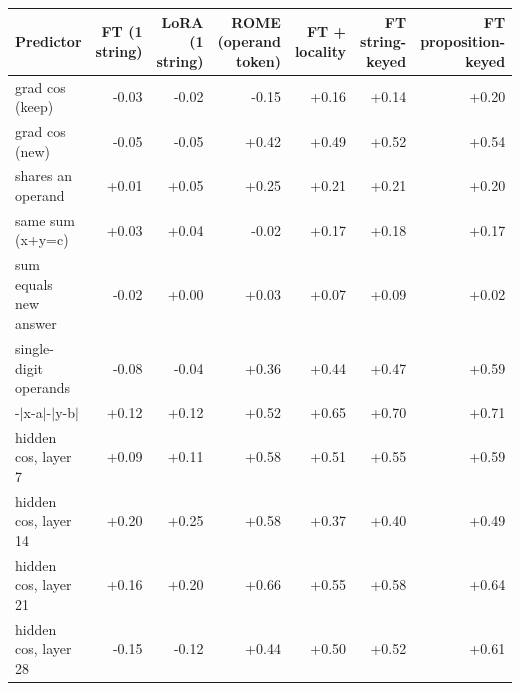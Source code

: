 \begin{tabular}{lrrrrrr}
\toprule
Predictor & FT (1 string) & LoRA (1 string) & ROME (operand token) & FT + locality & FT string-keyed & FT proposition-keyed \\
\midrule
grad cos (keep) & -0.03 & -0.02 & -0.15 & +0.16 & +0.14 & +0.20 \\
grad cos (new) & -0.05 & -0.05 & +0.42 & +0.49 & +0.52 & +0.54 \\
shares an operand & +0.01 & +0.05 & +0.25 & +0.21 & +0.21 & +0.20 \\
same sum (x+y=c) & +0.03 & +0.04 & -0.02 & +0.17 & +0.18 & +0.17 \\
sum equals new answer & -0.02 & +0.00 & +0.03 & +0.07 & +0.09 & +0.02 \\
single-digit operands & -0.08 & -0.04 & +0.36 & +0.44 & +0.47 & +0.59 \\
-$|$x-a$|$-$|$y-b$|$ & +0.12 & +0.12 & +0.52 & +0.65 & +0.70 & +0.71 \\
hidden cos, layer 7 & +0.09 & +0.11 & +0.58 & +0.51 & +0.55 & +0.59 \\
hidden cos, layer 14 & +0.20 & +0.25 & +0.58 & +0.37 & +0.40 & +0.49 \\
hidden cos, layer 21 & +0.16 & +0.20 & +0.66 & +0.55 & +0.58 & +0.64 \\
hidden cos, layer 28 & -0.15 & -0.12 & +0.44 & +0.50 & +0.52 & +0.61 \\
\bottomrule
\end{tabular}
